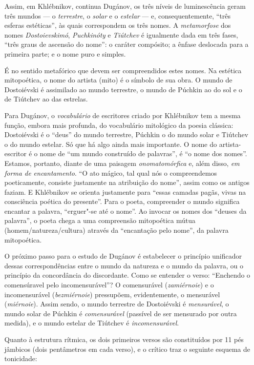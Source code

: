 Assim, em Khlébnikov, continua Dugánov, os três níveis de
luminescência geram três mundos --- o \emph{terrestre}, o \emph{solar}
e o \emph{estelar} --- e, consequentemente, ``três esferas estéticas'', às quais
correspondem os três nomes. A \emph{metamorfose} dos nomes \emph{Dostoievskimó},
\emph{Puchkinóty} e \emph{Tiútchev} é igualmente dada em três fases, ``três
graus de ascensão do nome'': o caráter compósito; a ênfase deslocada para a primeira parte; e
o nome puro e simples.

É no sentido metafórico que devem ser compreendidos estes nomes. Na
estética mitopoética, o nome do artista (mito) é o símbolo de sua obra. O mundo
de Dostoiévski é assimilado ao mundo terrestre, o mundo de Púchkin ao do
sol e o de Tiútchev ao das estrelas. 

Para Dugánov, o \emph{vocabulário} de escritores criado por
Khlébnikov tem a mesma função, embora mais profunda, do vocabulário mitológico da poesia
clássica: Dostoiévski é o ``deus'' do mundo terrestre, Púchkin o do mundo
solar e Tiútchev o do mundo estelar. Só que há algo ainda mais importante. O nome do artista-escritor é o nome de
``um mundo construído de palavras'', é ``o nome dos nomes''. Estamos, portanto,
diante de uma paisagem \emph{onomatomórfica} e, além disso,
\emph{em forma de encantamento}. ``O ato mágico, tal qual
nós o compreendemos poeticamente, consiste justamente na
atribuição do nome'', assim como os antigos faziam. E Khlébnikov se orienta justamente para
``essas camadas pagãs, vivas na consciência poética do presente''. Para o poeta,
compreender o mundo significa encantar a palavra, ``erguer"-se até o nome''.
Ao invocar os nomes dos ``deuses da palavra'', o poeta chega a uma compreensão mitopoética
mútua (homem/natureza/cultura) através da ``encantação pelo nome'', da palavra mitopoética.

O próximo passo para o estudo de Dugánov é estabelecer o princípio
unificador dessas correspondências entre o mundo da natureza e o mundo
da palavra, ou o princípio da concordância do discordante. Como se
entender o verso: ``Enchendo o comensúravel pelo incomensurável''? O
comensurável (\emph{zamiérnoie}) e o incomensurável (\emph{bezmiérnoie})
pressupõem, evidentemente, o mensurável (\emph{miérnoie}). Assim sendo,
o mundo terrestre de Dostoiévski é \emph{mensurável}, o mundo solar de
Púchkin é \emph{comensurável} (passível de ser mensurado por outra
medida), e o mundo estelar de Tiútchev é \emph{incomensurável}.

Quanto à estrutura rítmica, os dois primeiros versos são constituídos
por 11 pés jâmbicos (dois pentâmetros em cada verso), e o crítico traz o
seguinte esquema de tonicidade:

